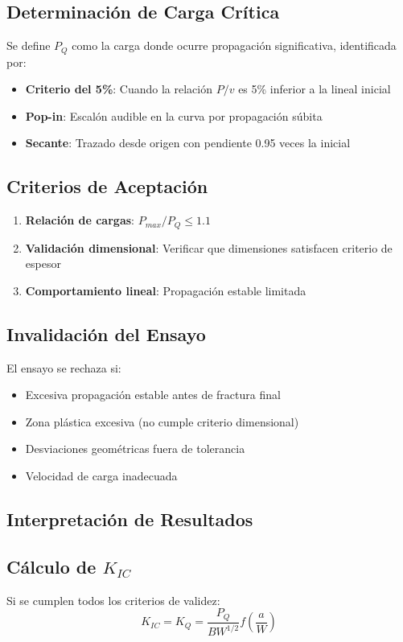 \documentclass[12pt,letterpaper]{article}
\begin{document}
\subsection{Determinación de Carga Crítica}
Se define $P_Q$ como la carga donde ocurre propagación significativa, identificada por:
\begin{itemize}
\item \textbf{Criterio del 5\%}: Cuando la relación $P/v$ es 5\% inferior a la lineal inicial
\item \textbf{Pop-in}: Escalón audible en la curva por propagación súbita
\item \textbf{Secante}: Trazado desde origen con pendiente 0.95 veces la inicial
\end{itemize}

\subsection{Criterios de Aceptación}
\begin{enumerate}
\item \textbf{Relación de cargas}: $P_{max}/P_Q \leq 1.1$
\item \textbf{Validación dimensional}: Verificar que dimensiones satisfacen criterio de espesor
\item \textbf{Comportamiento lineal}: Propagación estable limitada
\end{enumerate}

\subsection{Invalidación del Ensayo}
El ensayo se rechaza si:
\begin{itemize}
\item Excesiva propagación estable antes de fractura final
\item Zona plástica excesiva (no cumple criterio dimensional)
\item Desviaciones geométricas fuera de tolerancia
\item Velocidad de carga inadecuada
\end{itemize}

\subsection{Interpretación de Resultados}

\subsection{Cálculo de $K_{IC}$}
Si se cumplen todos los criterios de validez:
\[K_{IC} = K_Q = \frac{P_Q}{BW^{1/2}} f\left(\frac{a}{W}\right)\]
\end{document}

